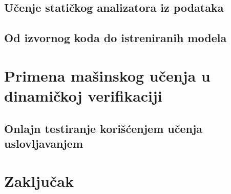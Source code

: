 \documentclass[11pt]{beamer}
\theoremstyle{definition}
\begin{document}
\subsection{Učenje statičkog analizatora iz podataka}
\label{subsec:staticki-analizator}

\subsection{Od izvornog koda do istreniranih modela}
\label{subsec:pregled}

\section{Primena mašinskog učenja u dinamičkoj verifikaciji}
\label{sec:dinamcikaPrimena}

\subsection{Onlajn testiranje korišćenjem učenja uslovljavanjem }

\section{Zaključak}
\label{sec:zakljucak}
\end{document}
